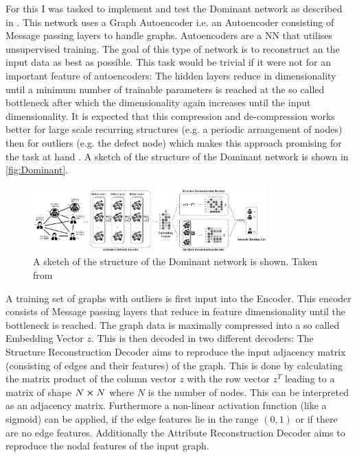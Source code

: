 \documentclass[11pt,a4paper]{article}
\begin{document}
For this I was tasked to implement and test the Dominant network as described in \cite{dingDeepAnomalyDetection2019}. 
This network uses a Graph Autoencoder i.e. an Autoencoder consisting of Message passing layers to handle graphs. 
Autoencoders are a NN that utilises unsupervised training. 
The goal of this type of network is to reconstruct an the input data as best as possible. 
This task would be trivial if it were not for an important feature of autoencoders: 
The hidden layers reduce in dimensionality until a minimum number of trainable parameters is reached at the so called bottleneck after which the dimensionality again increases until the input dimensionality. 
It is expected that this compression and de-compression works better for large scale recurring structures (e.g. a periodic arrangement of nodes) then for outliers (e.g. the defect node) which makes this approach promising for the task at hand \cite{dingDeepAnomalyDetection2019}. 
A sketch of the structure of the Dominant network is shown in \autoref{fig:Dominant}.
\begin{figure}[htbp]
    \centering
    \includegraphics[width=0.8\textwidth]{images/ding_1.png}
    \caption{A sketch of the structure of the Dominant network is shown. Taken from \cite[Fig.1]{dingDeepAnomalyDetection2019}}
    \label{fig:Dominant}
\end{figure}
A training set of graphs with outliers is first input into the Encoder. 
This encoder consists of Message passing layers that reduce in feature dimensionality until the bottleneck is reached. 
The graph data is maximally compressed into a so called Embedding Vector $z$. 
This is then decoded in two different decoders: 
The Structure Reconstruction Decoder aims to reproduce the input adjacency matrix  (consisting of edges and their features) of the graph. 
This is done by calculating the matrix product of the column vector $z$ with the row vector $z^T$ leading to a matrix of shape $N\cross N$ where $N$ is the number of nodes. 
This can be interpreted as an adjacency matrix. 
Furthermore a non-linear activation function (like a sigmoid) can be applied, if the edge features lie in the range $(0,1)$ or if there are no edge features. 
Additionally the Attribute Reconstruction Decoder aims to reproduce the nodal features of the input graph. 
\end{document}
